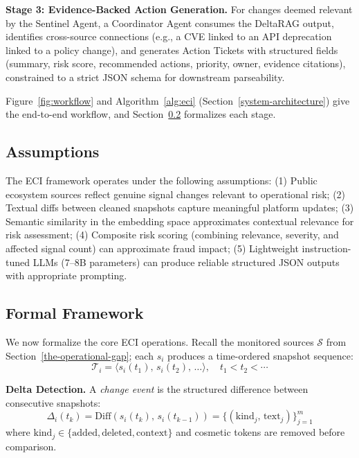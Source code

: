 \documentclass[
]{article}
\begin{document}
\textbf{Stage 3: Evidence-Backed Action Generation.} For changes deemed
relevant by the Sentinel Agent, a Coordinator Agent consumes the DeltaRAG
output, identifies cross-source connections (e.g., a CVE linked to an API
deprecation linked to a policy change), and generates Action Tickets with
structured fields (summary, risk score, recommended actions, priority,
owner, evidence citations), constrained to a strict JSON schema for
downstream parseability.

Figure~\ref{fig:workflow} and Algorithm~\ref{alg:eci}
(Section~\ref{system-architecture}) give the end-to-end workflow, and
Section~\ref{formal-framework} formalizes each stage.

\subsection{Assumptions}\label{assumptions}

The ECI framework operates under the following assumptions: (1) Public
ecosystem sources reflect genuine signal changes relevant to operational
risk; (2) Textual diffs between cleaned snapshots capture meaningful
platform updates; (3) Semantic similarity in the embedding space
approximates contextual relevance for risk assessment; (4) Composite
risk scoring (combining relevance, severity, and affected signal count)
can approximate fraud impact; (5) Lightweight instruction-tuned LLMs
(7--8B parameters) can produce reliable structured JSON outputs with
appropriate prompting.

\subsection{Formal Framework}\label{formal-framework}

We now formalize the core ECI operations. Recall the monitored sources
$\mathcal{S}$ from Section~\ref{the-operational-gap}; each $s_i$ produces a
time-ordered snapshot sequence:
\begin{equation}
  \mathcal{T}_i = \langle s_i(t_1),\, s_i(t_2),\, \ldots \rangle, \quad t_1 < t_2 < \cdots
\end{equation}

\noindent\textbf{Delta Detection.} A \emph{change event} is the
structured difference between consecutive snapshots:
\begin{equation}
  \Delta_i(t_k) = \mathrm{Diff}\!\left(s_i(t_k),\, s_i(t_{k-1})\right)
                = \bigl\{(\mathrm{kind}_j,\, \mathrm{text}_j)\bigr\}_{j=1}^{m}
\end{equation}
where $\mathrm{kind}_j \in \{\mathrm{added}, \mathrm{deleted}, \mathrm{context}\}$ and cosmetic tokens are removed before comparison.
\end{document}
